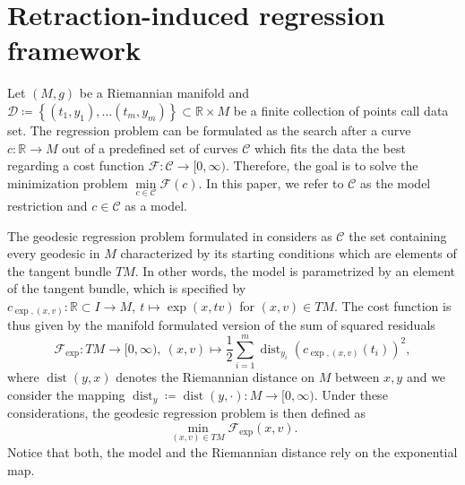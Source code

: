\documentclass[11pt,a4paper]{article}
\theoremstyle{plain}
\theoremstyle{definition}
\newcommand{\RR}{\mathbb{R}}
\DeclareMathOperator{\dist}{dist}
\begin{document}
\section{Retraction-induced regression framework} 
\label{sec:main}

Let $(M, g)$ be a Riemannian manifold and $\mathcal{D}\coloneqq \left\{(t_1, y_1), \ldots (t_m, y_m)\right\}\subset \RR\times M$ be a finite collection of points call data set. The regression problem can be formulated as the search after a curve $c\colon \RR\to M$ out of a predefined set of curves $\mathcal{C}$ which fits the data the best regarding a cost function $\mathcal{F}\colon \mathcal{C}\to[0, \infty)$. Therefore, the goal is to solve the minimization problem $\min\limits_{c\in\mathcal{C}} \mathcal{F}(c)$. In this paper, we refer to $\mathcal{C}$ as the model restriction and $c\in\mathcal{C}$ as a model.

The geodesic regression problem formulated in \cite{fletcher2013} considers as $\mathcal{C}$ the set containing every geodesic in $M$ characterized by its starting conditions which are elements of the tangent bundle $TM$. In other words, the model is parametrized by an element of the tangent bundle, which is specified by $c_{\exp, (x, v)}\colon \RR \subset I \to M,\ t\mapsto \exp(x, tv)$ for $(x, v)\in TM$. The cost function is thus given by the manifold formulated version of the sum of squared residuals 
\begin{equation}
\label{eq:sum_squares}
	\mathcal{F}_{\exp}\colon TM\to [0, \infty),\
	(x, v)\mapsto \frac{1}{2} \sum\limits_{i = 1}^m \dist_{y_i}\left(c_{\exp, (x, v)}(t_i)\right)^2,
\end{equation}
where $\dist(y,x)$ denotes the Riemannian distance on $M$ between $x,y$ and we consider the mapping $\dist_{y}\coloneqq \dist(y, \cdot)\colon M\to [0, \infty)$. 
Under these considerations, the geodesic regression problem is then defined as
\begin{equation}
\label{eq:regression_main}
\min_{(x,v)\in TM} \mathcal{F}_{\exp}(x,v).
\end{equation}
Notice that both, the model and the Riemannian distance rely on the exponential map.
\end{document}

